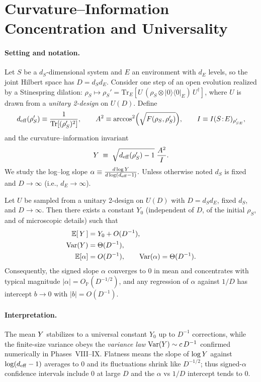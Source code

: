 \appendix
\section{Curvature--Information Concentration and Universality}\label{app:theorem}

\paragraph{Setting and notation.}
Let $S$ be a $d_S$-dimensional system and $E$ an environment with $d_E$ levels, so the joint Hilbert space has
$D = d_S d_E$.
Consider one step of an open evolution realized by a Stinespring dilation:
$\rho_S \mapsto \rho_S' = \mathrm{Tr}_E\!\left[ U\, (\rho_S \otimes |0\rangle\!\langle 0|_E )\, U^\dagger \right]$,
where $U$ is drawn from a \emph{unitary 2-design} on $U(D)$.
Define
\[
d_{\mathrm{eff}}(\rho_S') \equiv \frac{1}{\mathrm{Tr}[(\rho_S')^2]},\qquad
A^2 \equiv \arccos^2\!\Big( \sqrt{F(\rho_S,\rho_S')} \Big),\qquad
I \equiv I(S\!:\!E)_{\rho_{SE}'},
\]
and the curvature--information invariant
\[
Y \;\equiv\; \sqrt{d_{\mathrm{eff}}(\rho_S') - 1}\;\frac{A^2}{I}.
\]
We study the log--log slope
\(
\alpha \equiv \frac{d \log Y}{d \log( d_{\mathrm{eff}} - 1)}.
\)
Unless otherwise noted $d_S$ is fixed and $D \to \infty$ (i.e., $d_E \to \infty$).

\begin{theorem}
\label{thm:CI}
Let $U$ be sampled from a unitary 2-design on $U(D)$ with $D=d_S d_E$, fixed $d_S$, and $D\to\infty$.
Then there exists a constant $Y_0$ (independent of $D$, of the initial $\rho_S$, and of microscopic details) such that
\begin{align}
\mathbb{E}[\,Y\,] &= Y_0 + O(D^{-1}),\\
\mathrm{Var}(Y) &= \Theta(D^{-1}),\\
\mathbb{E}[\alpha] &= O(D^{-1}), \qquad \mathrm{Var}(\alpha) = \Theta(D^{-1}).
\end{align}
Consequently, the signed slope $\alpha$ converges to $0$ in mean and concentrates with typical magnitude
$|\alpha| = O_\mathbb{P}(D^{-1/2})$, and any regression of $\alpha$ against $1/D$ has intercept $b \to 0$ with
$|b| = O(D^{-1})$.
\end{theorem}

\paragraph{Interpretation.}
The mean $Y$ stabilizes to a universal constant $Y_0$ up to $D^{-1}$ corrections, while the finite-size variance obeys
the \emph{variance law} $\mathrm{Var}(Y) \sim c\,D^{-1}$ confirmed numerically in Phases~VIII--IX. Flatness means the slope of
$\log Y$ against $\log(d_{\mathrm{eff}}-1)$ averages to $0$ and its fluctuations shrink like $D^{-1/2}$; thus signed-$\alpha$
confidence intervals include $0$ at large $D$ and the $\alpha$ vs $1/D$ intercept tends to $0$.

